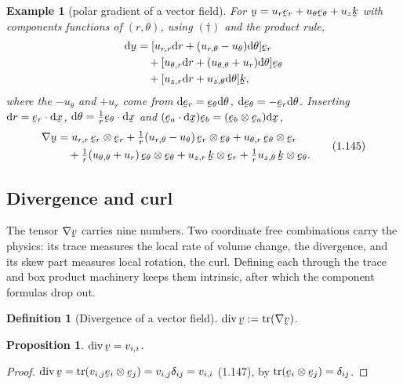 \documentclass[17pt,a4paper]{extreport}
\DeclareRobustCommand{\vek}[1]{\underaccent{\tilde}{#1}}
\newcommand{\tr}{\operatorname{tr}}
\newcommand{\grad}{\nabla}
\newcommand{\dvg}{\operatorname{div}}
\newcommand{\bu}{\vek{u}}
\newcommand{\bv}{\vek{v}}
\newcommand{\bx}{\vek{x}}
\newcommand{\be}{\vek{e}}
\newcommand{\bk}{\vek{k}}
\newcommand{\ber}{\vek{e}_{r}}
\renewcommand{\beth}{\vek{e}_{\theta}}
\newcommand{\dd}{\delta}
\newcommand{\dl}{\mathrm{d}}
\theoremstyle{scplain}
\newtheorem{proposition}[theorem]{Proposition}
\theoremstyle{scdefn}
\newtheorem{definition}[theorem]{Definition}
\newtheorem{example}[theorem]{Example}
\theoremstyle{scplain}
\begin{document}
\begin{example}[polar gradient of a vector field]\label{ex:gupolar}
For $\bu=u_r\ber+u_\theta\beth+u_z\bk$ with components functions of
$(r,\theta)$, using $(\dagger)$ and the product rule,
\[
\begin{aligned}
\dl\bu&=[u_{r,r}\dl r+(u_{r,\theta}-u_\theta)\dl\theta]\ber\\
&\quad+[u_{\theta,r}\dl r+(u_{\theta,\theta}+u_r)\dl\theta]\beth\\
&\quad+[u_{z,r}\dl r+u_{z,\theta}\dl\theta]\bk,
\end{aligned}
\]
where the $-u_\theta$ and $+u_r$ come from
$\dl\ber=\beth\dl\theta$, $\dl\beth=-\ber\dl\theta$. Inserting
$\dl r=\ber\cdot\dl\bx$, $\dl\theta=\tfrac1r\beth\cdot\dl\bx$ and
$(\be_a\cdot\dl\bx)\be_b=(\be_b\otimes\be_a)\dl\bx$,
\begin{equation}
\begin{aligned}
\grad\bu&=u_{r,r}\,\ber\otimes\ber
+\tfrac1r(u_{r,\theta}-u_\theta)\,\ber\otimes\beth
+u_{\theta,r}\,\beth\otimes\ber\\
&\quad+\tfrac1r(u_{\theta,\theta}+u_r)\,\beth\otimes\beth
+u_{z,r}\,\bk\otimes\ber+\tfrac1r u_{z,\theta}\,\bk\otimes\beth.
\end{aligned}\tag{1.145}\label{eq:1.145}
\end{equation}
\end{example}

\subsection{Divergence and curl}\label{ss:divcurl}

The tensor $\grad\bv$ carries nine numbers. Two coordinate free
combinations carry the physics: its trace measures the local rate of volume
change, the divergence, and its skew part measures local rotation, the
curl. Defining each through the trace and box product machinery keeps them
intrinsic, after which the component formulas drop out.

\begin{definition}[Divergence of a vector field]\label{def:divv}
$\dvg\bv:=\tr(\grad\bv)$.
\end{definition}

\begin{proposition}\label{prop:divv}
$\dvg\bv=v_{i,i}$.
\end{proposition}

\begin{proof}
$\dvg\bv=\tr(v_{i,j}\be_i\otimes\be_j)=v_{i,j}\dd_{ij}=v_{i,i}$ (1.147), by
$\tr(\be_i\otimes\be_j)=\dd_{ij}$.
\end{proof}
\end{document}
